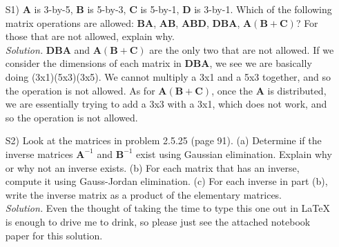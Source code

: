 \documentclass[12pt]{article}
\begin{document}
\begin{itemize}
\item[S1)] $\mathbf{A}$ is 3-by-5,  $\mathbf{B}$ is 5-by-3,  $\mathbf{C}$ is 5-by-1,  $\mathbf{D}$ is 3-by-1. Which of the following matrix operations are allowed: $\mathbf{B}\mathbf{A}$, \hspace{7pt} $\mathbf{A}\mathbf{B}$, \hspace{7pt} $\mathbf{A}\mathbf{B}\mathbf{D}$, \hspace{7pt} $\mathbf{D}\mathbf{B}\mathbf{A}$, \hspace{7pt} $\mathbf{A}(\mathbf{B}+\mathbf{C})$?  For those that are not allowed, explain why. \\
\textit{Solution.} $\mathbf{DBA}$ and $\mathbf{A(B+C)}$ are the only two that are not allowed. If we consider the dimensions of each matrix in $\mathbf{DBA}$, we see we are basically doing (3x1)(5x3)(3x5). We cannot multiply a 3x1 and a 5x3 together, and so the operation is not allowed. As for $\mathbf{A(B+C)}$, once the $\mathbf{A}$ is distributed, we are essentially trying to add a 3x3 with a 3x1, which does not work, and so the operation is not allowed.


\item[S2)] Look at the matrices in problem 2.5.25 (page 91).  (a) Determine if the inverse matrices $\mathbf{A}^{-1}$ and $\mathbf{B}^{-1}$ exist using Gaussian elimination. Explain why or why not an inverse exists.  (b) For each matrix that has an inverse, compute it using Gauss-Jordan elimination. (c) For each inverse in part (b), write the inverse matrix as a product of the elementary matrices.\\
\textit{Solution.} Even the thought of taking the time to type this one out in \LaTeX \hspace{.5mm} is enough to drive me to drink, so please just see the attached notebook paper for this solution.


\end{itemize}
\end{document}
